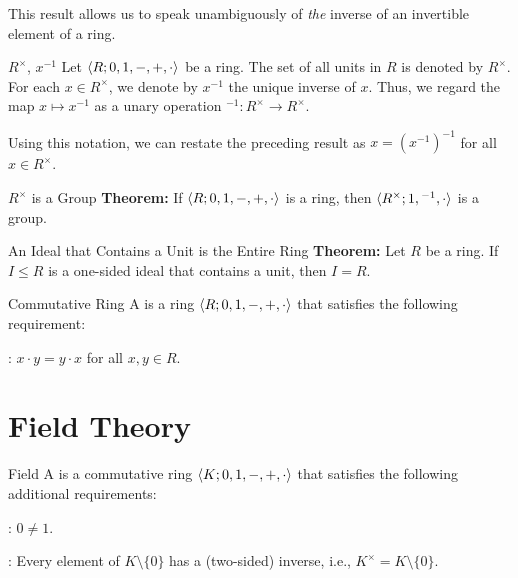 \documentclass[12pt]{report}
\begin{document}
This result allows us to speak unambiguously of \textit{the} inverse of an invertible element of a ring.

\begin{dfnbox}{$R^\times$, $x^{-1}$}
	Let ${\langle {R; 0, 1, -, +, \cdot} \rangle}$ be a ring. The set of all units in $R$ is denoted by $R^\times$. For each $x \in R^\times$, we denote by $x^{-1}$ the unique inverse of $x$. Thus, we regard the map $x \mapsto x^{-1}$ as a unary operation ${}^{-1}: R^\times \to R^\times$.
\end{dfnbox}

Using this notation, we can restate the preceding result as $x = (x^{-1})^{-1}$ for all $x \in R^\times$.

\begin{thmbox}{$R^\times$ is a Group}
	\textbf{Theorem:} If ${\langle {R; 0, 1, -, +, \cdot} \rangle}$ is a ring, then ${\langle {R^\times; 1, {}^{-1}, \cdot} \rangle}$ is a group.
\end{thmbox}

\begin{thmbox}{An Ideal that Contains a Unit is the Entire Ring}
	\textbf{Theorem:} Let $R$ be a ring. If $I \le R$ is a one-sided ideal that contains a unit, then $I = R$.
\end{thmbox}

\begin{dfnbox}{Commutative Ring}
	A  is a ring ${\langle {R; 0, 1, -, +, \cdot} \rangle}$ that satisfies the following requirement:
	\begin{dfnitems}
		\item {}: $x \cdot y = y \cdot x$ for all $x, y \in R$.
	\end{dfnitems}
\end{dfnbox}



\chapter{Field Theory}

\begin{dfnbox}{Field}
	A  is a commutative ring ${\langle {K; 0, 1, -, +, \cdot} \rangle}$ that satisfies the following additional requirements:
	\begin{dfnitems}
		\item {}: $0 \ne 1$.
		\item {}: Every element of $K \setminus \{0\}$ has a (two-sided) inverse, i.e., $K^\times = K \setminus \{0\}$.
	\end{dfnitems}
\end{dfnbox}
\end{document}
